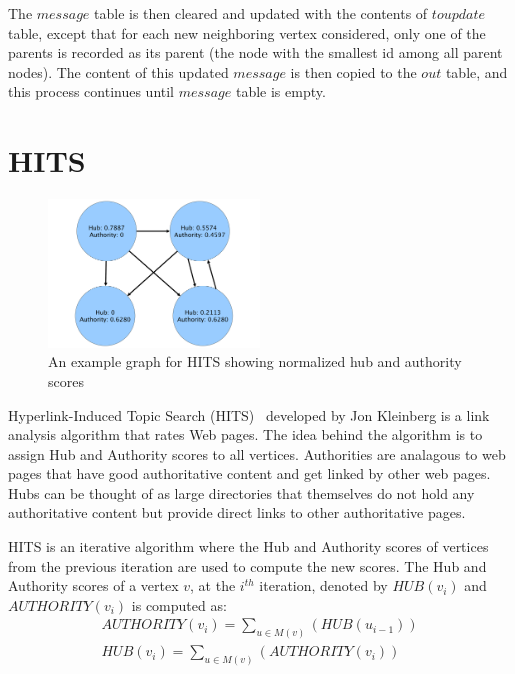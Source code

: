 The $message$ table is then cleared and updated with the contents of $toupdate$
table, except that for each new neighboring vertex considered, only one of the
parents is recorded as its parent (the node with the smallest id among all
parent nodes). The content of this updated $message$ is then copied
to the $out$ table, and this process continues until $message$ table is empty.


\section{HITS} \label{sec:graph:hits}
\begin{figure}[h]
	\centering
	\includegraphics[width=0.5\textwidth]{figures/hits_example.pdf}
\caption{An example graph for HITS showing normalized hub and authority scores}
\label{hits:example}
\end{figure}

Hyperlink-Induced Topic Search (HITS)~\cite{hits} developed by Jon Kleinberg is
a link analysis algorithm that rates Web pages. The idea behind the algorithm is
to assign Hub and Authority scores to all vertices. Authorities are analagous to
web pages that have good authoritative content and get linked by other web pages.
Hubs can be thought of as large directories that themselves do not hold any
authoritative content but provide direct links to other authoritative pages.

HITS is an iterative algorithm where the Hub and Authority scores of vertices
from the previous iteration are used to compute the new scores. The
Hub and Authority scores of a vertex $v$, at the $i^{th}$ iteration, denoted by
$HUB(v_i)$ and $AUTHORITY(v_i)$ is computed as:
\begin{equation}
    \begin{aligned}
        AUTHORITY(v_i) = \sum_{u \in M(v)}({HUB(u_{i-1})})\\
        HUB(v_i) = \sum_{u \in M(v)}({AUTHORITY(v_{i})})
    \end{aligned}
\label{eq:hits}
\end{equation}


